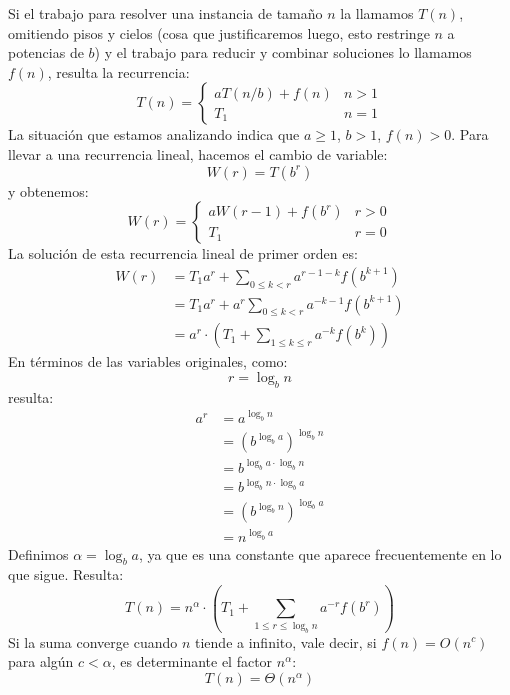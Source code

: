   Si el trabajo para resolver una instancia de tamaño \(n\)
  la llamamos \(T(n)\),
  omitiendo pisos y cielos
  (cosa que justificaremos luego,
   esto restringe \(n\) a potencias de \(b\))
  y el trabajo para reducir y combinar soluciones lo llamamos \(f(n)\),
  resulta la recurrencia:
  \begin{equation}
    \label{eq:divide-and-conquer}
    T(n)
      = \begin{cases}
          a T(n / b) + f(n) & n > 1 \\
          T_1		    & n = 1
        \end{cases}
  \end{equation}
  La situación que estamos analizando
  indica que \(a \ge 1\), \(b > 1\), \(f(n) > 0\).
  Para llevar a una recurrencia lineal,
  hacemos el cambio de variable:
  \begin{equation*}
    W(r)
      = T(b^r)
  \end{equation*}
  y obtenemos:
  \begin{equation*}
    W(r)
      = \begin{cases}
          a W(r - 1) + f(b^r)  & r > 0 \\
          T_1		       & r = 0
        \end{cases}
  \end{equation*}
  La solución de esta recurrencia lineal de primer orden es:
  \begin{align*}
    W(r)
      &= T_1 a^r + \sum_{0 \le k < r} a^{r - 1 - k} f(b^{k + 1}) \\
      &= T_1 a^r + a^r \sum_{0 \le k < r} a^{- k - 1} f(b^{k + 1}) \\
      &= a^r
           \cdot \left(
                   T_1 + \sum_{1 \le k \le r} a^{-k} f(b^k)
                 \right)
  \end{align*}
  En términos de las variables originales,
  como:
  \begin{equation*}
    r
      = \log_b n
  \end{equation*}
  resulta:
  \begin{align*}
    a^r
      &= a^{\log_b n} \\
      &= \left( b^{\log_b a} \right)^{\log_b n} \\
      &= b^{\log_b a \cdot \log_b n} \\
      &= b^{\log_b n \cdot \log_b a} \\
      &= \left( b^{\log_b n} \right)^{\log_b a} \\
      &= n^{\log_b a}
  \end{align*}
  Definimos \(\alpha = \log_b a\),
  ya que es una constante que aparece frecuentemente en lo que sigue.
  Resulta:
  \begin{equation*}
    T(n)
      = n^\alpha
         \cdot \left(
                 T_1 + \sum_{1 \le r \le \log_b n} a^{-r} f(b^r)
               \right)
  \end{equation*}
  Si la suma converge cuando \(n\) tiende a infinito,
  vale decir,
  si \(f(n) = O(n^c)\) para algún \(c < \alpha\),
  es determinante el factor \(n^\alpha\):
  \begin{equation*}
    T(n)
      = \Theta(n^\alpha)
  \end{equation*}

